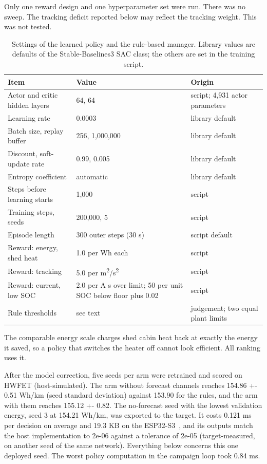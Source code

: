 \documentclass{ieeeaccess}
\begin{document}
Only one reward design and one hyperparameter set were run. There was no sweep. The tracking deficit reported below may reflect the tracking weight. This was not tested.

\begin{table}[!t]
\centering
\caption{Settings of the learned policy and the rule-based manager. Library values are defaults of the Stable-Baselines3 SAC class; the others are set in the training script.}
\label{tab:ems-hyper}
\footnotesize
\setlength{\tabcolsep}{3pt}
\renewcommand{\arraystretch}{1.15}
\begin{tabularx}{\textwidth}{@{}XXX@{}}
\hline
\textbf{Item} & \textbf{Value} & \textbf{Origin} \\
\hline
Actor and critic hidden layers & 64, 64 & script; 4,931 actor parameters \\
Learning rate & 0.0003 & library default \\
Batch size, replay buffer & 256, 1,000,000 & library default \\
Discount, soft-update rate & 0.99, 0.005 & library default \\
Entropy coefficient & automatic & library default \\
Steps before learning starts & 1,000 & script \\
Training steps, seeds & 200,000, 5 & script \\
Episode length & 300 outer steps (30 s) & script default \\
Reward: energy, shed heat & 1.0 per Wh each & script \\
Reward: tracking & 5.0 per m\textsuperscript{2}/s\textsuperscript{2} & script \\
Reward: current, low SOC & 2.0 per A s over limit; 50 per unit SOC below floor plus 0.02 & script \\
Rule thresholds & see text & judgement; two equal plant limits \\
\hline
\end{tabularx}
\end{table}

The comparable energy scale charges shed cabin heat back at exactly the energy it saved, so a policy that switches the heater off cannot look efficient. All ranking uses it.

After the model correction, five seeds per arm were retrained and scored on HWFET (host-simulated). The arm without forecast channels reaches 154.86 +- 0.51 Wh/km (seed standard deviation) against 153.90 for the rules, and the arm with them reaches 155.12 +- 0.82. The no-forecast seed with the lowest validation energy, seed 3 at 154.21 Wh/km, was exported to the target. It costs 0.121 ms per decision on average and 19.3 KB on the ESP32-S3~\cite{esp32s3}, and its outputs match the host implementation to 2e-06 against a tolerance of 2e-05 (target-measured, on another seed of the same network). Everything below concerns this one deployed seed. The worst policy computation in the campaign loop took 0.84 ms.
\end{document}

